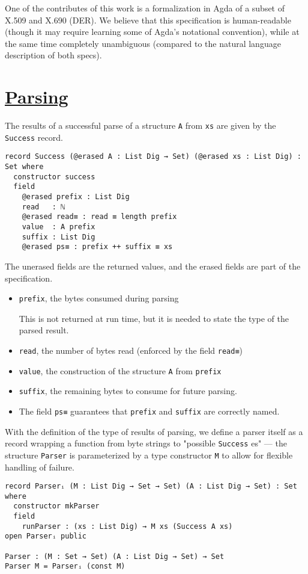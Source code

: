 \documentclass[11pt]{article}
\begin{document}
One of the contributes of this work is a formalization in Agda of a subset
of X.509 and X.690 (DER).
We believe that this specification is human-readable (though it may require
learning some of Agda's notational convention), while at the same time
completely unambiguous (compared to the natural language description of both
specs).

\section{\href{../src/Aeres/Grammar/Parser/Core.agda}{Parsing}}
\label{sec:orga03f60f}

The results of a successful parse of a structure \texttt{A} from \texttt{xs} are given by
the \texttt{Success} record.

\begin{verbatim}
record Success (@erased A : List Dig → Set) (@erased xs : List Dig) : Set where
  constructor success
  field
    @erased prefix : List Dig
    read   : ℕ
    @erased read≡ : read ≡ length prefix
    value  : A prefix
    suffix : List Dig
    @erased ps≡ : prefix ++ suffix ≡ xs
\end{verbatim}

The unerased fields are the returned values, and the erased fields are
part of the specification.
\begin{itemize}
\item \texttt{prefix}, the bytes consumed during parsing

This is not returned at run time, but it is needed to state the type of the
parsed result.
\item \texttt{read}, the number of bytes read (enforced by the field \texttt{read≡})
\item \texttt{value}, the construction of the structure \texttt{A} from \texttt{prefix}
\item \texttt{suffix}, the remaining bytes to consume for future parsing.
\item The field \texttt{ps≡} guarantees that \texttt{prefix} and \texttt{suffix} are correctly named.
\end{itemize}

With the definition of the type of results of parsing, we define a parser
itself as a record wrapping a function from byte strings to "possible
\texttt{Success} es" --- the structure \texttt{Parser} is parameterized by a type
constructor \texttt{M} to allow for flexible handling of failure.

\begin{verbatim}
record Parserᵢ (M : List Dig → Set → Set) (A : List Dig → Set) : Set where
  constructor mkParser
  field
    runParser : (xs : List Dig) → M xs (Success A xs)
open Parserᵢ public

Parser : (M : Set → Set) (A : List Dig → Set) → Set
Parser M = Parserᵢ (const M)
\end{verbatim}
\end{document}
